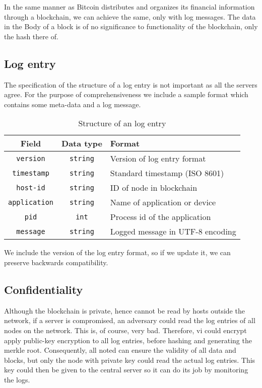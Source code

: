 
In the same manner as Bitcoin distributes and organizes its financial
information through a blockchain, we can achieve the same, only with
log messages. The data in the Body of a block is of no significance to
functionality of the blockchain, only the hash there of.



\subsection{Log entry}
The specification of the structure of a log entry is not important as
all the servers agree. For the purpose of comprehensiveness we include
a sample format which contains some meta-data and a log message.
\begin{table}[H]
  \centering
  \begin{tabular}{c|c|l}
    Field                & Data type       & Format                                    \\ \hline
    \texttt{version}     & \texttt{string} & Version of log entry format               \\
    \texttt{timestamp}   & \texttt{string} & Standard timestamp (ISO 8601)             \\
    \texttt{host-id}     & \texttt{string} & ID of node in blockchain                  \\
    \texttt{application} & \texttt{string} & Name of application or device             \\
    \texttt{pid}         & \texttt{int}    & Process id of the application             \\
    \texttt{message}     & \texttt{string} & Logged message in UTF-8 encoding
  \end{tabular}
  \caption{\label{tab:log-entry} Structure of an log entry}
\end{table}
We include the version of the log entry format, so if we update it, we
can preserve backwards compatibility.



\subsection{Confidentiality}
Although the blockchain is private, hence cannot be read by hosts
outside the network, if a server is compromised, an adversary could
read the log entries of all nodes on the network. This is, of course,
very bad. Therefore, vi could encrypt apply public-key encryption to
all log entries, before hashing and generating the merkle
root. Consequently, all noted can ensure the validity of all data and
blocks, but only the node with private key could read the actual log
entries. This key could then be given to the central server so it can
do its job by monitoring the logs.


